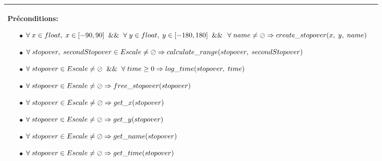 \documentclass[a4paper, 11pt, oneside]{article}
\begin{document}
\begin{tabular}{|p{17cm}|c}
			\textbf{Préconditions:}
				\begin{itemize}
					\item[$\bullet$] $\forall \hspace{1mm} x \in float, \hspace{1mm} x \in [-90,90] \hspace{2mm} \&\& \hspace{2mm} \forall \hspace{1mm} y \in float, \hspace{1mm} y \in [-180,180]  \hspace{2mm} \&\&$ \newline $\forall \hspace{1mm} name \neq \oslash \Rightarrow create\_stopover(x, \hspace{1mm} y, \hspace{1mm} name)$
					\item[$\bullet$] $\forall \hspace{1mm} stopover, \hspace{1mm} secondStopover \in Escale \neq \oslash \Rightarrow calculate\_range(stopover, \hspace{1mm} secondStopover)$
					\item[$\bullet$] $\forall \hspace{1mm} stopover \in Escale \neq \oslash \hspace{2mm} \&\& \hspace{2mm} \forall \hspace{1mm} time \geq 0 \Rightarrow log\_time(stopover, \hspace{1mm} time) $
					\item[$\bullet$] $\forall \hspace{1mm} stopover \in Escale \neq \oslash \Rightarrow free\_stopover(stopover)$ 
					\item[$\bullet$] $\forall \hspace{1mm} stopover \in Escale \neq \oslash \Rightarrow get\_x(stopover)$ 
					\item[$\bullet$] $\forall \hspace{1mm} stopover \in Escale \neq \oslash \Rightarrow get\_y(stopover)$ 
					\item[$\bullet$] $\forall \hspace{1mm} stopover \in Escale \neq \oslash \Rightarrow get\_name(stopover)$ 
					\item[$\bullet$] $\forall \hspace{1mm} stopover \in Escale \neq \oslash \Rightarrow get\_time(stopover)$ 
				\end{itemize}
				
			\\	
			\hline
		\end{tabular}
		 
		\footnotetext{\textcolor{red}{Nom des opérations interne}} 
		\footnotetext{\textcolor{green}{Arguments}} 
		\footnotetext{\textcolor{blue}{Types de retour}} 
		\footnotetext{\textcolor{magenta}{Nom des opérations d'observation}} 
	
\end{document}
